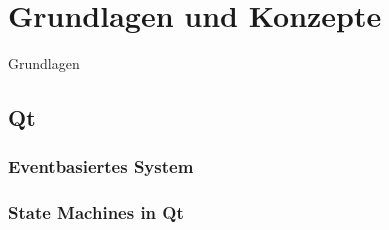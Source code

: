 
\chapter{Grundlagen und Konzepte}
\label{sec:Grundlagen}

Grundlagen

\section{Qt}

\subsection{Eventbasiertes System}
\label{sec:Eventbasiert}

\subsection{State Machines in Qt}
\label{sec:StateMachines}



\cite{qt_statemachine}